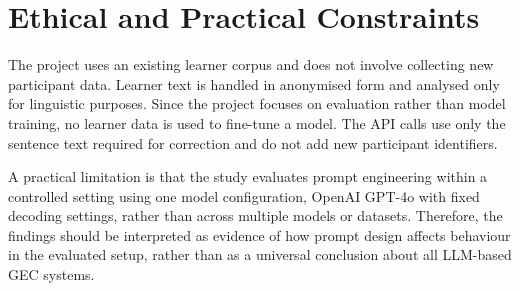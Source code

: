 \section{Ethical and Practical Constraints}

The project uses an existing learner corpus and does not involve collecting new participant data. Learner text is handled in anonymised form and analysed only for linguistic purposes. Since the project focuses on evaluation rather than model training, no learner data is used to fine-tune a model. The API calls use only the sentence text required for correction and do not add new participant identifiers.

A practical limitation is that the study evaluates prompt engineering within a controlled setting using one model configuration, OpenAI GPT-4o with fixed decoding settings, rather than across multiple models or datasets. Therefore, the findings should be interpreted as evidence of how prompt design affects behaviour in the evaluated setup, rather than as a universal conclusion about all LLM-based GEC systems.
